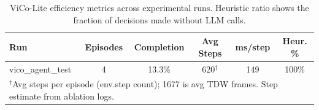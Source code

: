 \begin{table}[t]
\centering
\caption{ViCo-Lite efficiency metrics across experimental runs. Heuristic ratio shows the fraction of decisions made without LLM calls.}
\label{tab:efficiency}
\begin{tabular}{lccccc}
\toprule
\textbf{Run} & \textbf{Episodes} & \textbf{Completion} & \textbf{Avg Steps} & \textbf{ms/step} & \textbf{Heur. \%} \\
\midrule
vico\_agent\_test & 4 & 13.3\% & 620$^\dagger$ & 149 & 100\% \\
\multicolumn{6}{l}{\footnotesize $^\dagger$Avg steps per episode (env.step count); 1677 is avg TDW frames. Step estimate from ablation logs.} \\
\bottomrule
\end{tabular}
\end{table}